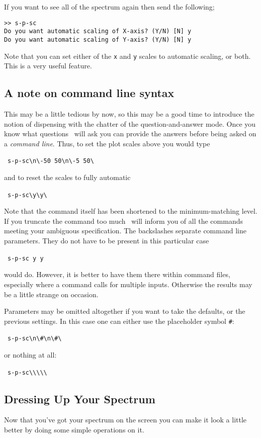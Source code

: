 If you want to see all of the spectrum again then send the following;

\begin{verbatim}
>> s-p-sc
Do you want automatic scaling of X-axis? (Y/N) [N] y
Do you want automatic scaling of Y-axis? (Y/N) [N] y
\end{verbatim}

Note that you can set either of the {\tt x} and {\tt y} scales to
automatic scaling, or both. This is a very useful feature.

\subsection{A note on command line syntax}
\label{sec:command-line}
This may be a little tedious by now, so this may be a good time to
introduce the notion of dispensing with the chatter of the
question-and-answer mode.  Once you know what questions \SPECX\ will
ask you can provide the answers before being asked on a {\it command
line}.  Thus, to set the plot scales above you would type

\SP\ \verb|s-p-sc\n\-50 50\n\-5 50\ |

and to reset the scales to fully automatic

\SP\ \verb|s-p-sc\y\y\ |

Note that the command itself has been shortened to the
minimum-matching level.  If you truncate the command too much \SPECX\
will inform you of all the commands meeting your ambiguous
specification. The backslashes separate command line parameters. They
do not have to be present in this particular case \ie\

\SP\ \verb|s-p-sc y y |

would do. However, it is better to have them there within command
files, especially where a command calls for multiple inputs. Otherwise
the results may be a little strange on occasion.

Parameters may be omitted altogether if you want to take the defaults,
or the previous settings. In this case one can either use the
placeholder symbol
\verb+#+: 

\SP\ \verb|s-p-sc\n\#\n\#\ |

or nothing at all:

\SP\ \verb|s-p-sc\\\\\ |

\subsection{Dressing Up Your Spectrum}
\label{sec:specx_5.2}
Now that you've got your spectrum on the screen you can make it look a
little better by doing some simple operations on it.  


